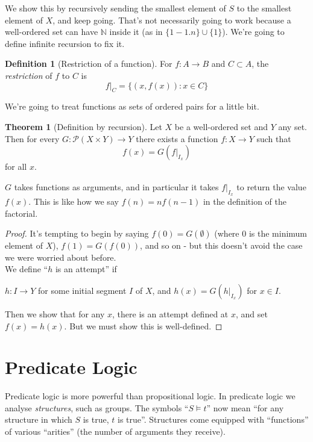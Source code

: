\documentclass{article}
\theoremstyle{definition}
\newtheorem{definition}{Definition}
\newtheorem{theorem}{Theorem}
\numberwithin{definition}{section}
\newcommand{\entails}{\models}
\begin{document}
We show this by recursively sending the smallest element of $S$ to the smallest element of $X$, and keep going. That's not necessarily going to work because a well-ordered set can have $\mathbb{N}$ inside it (as in $\{1-1.n\} \cup \{1\}$). We're going to define infinite recursion to fix it. \\
\begin{definition}[Restriction of a function]
For $f: A \to B$ and $C \subset A$, the \textit{restriction} of $f$ to $C$ is 
$$f|_{C} = \{(x,f(x)) : x \in C\}$$
\end{definition}
We're going to treat functions as sets of ordered pairs for a little bit. 
\begin{theorem}[Definition by recursion]
Let $X$ be a well-ordered set and $Y$ any set. Then for every $G: \mathcal{P}(X \times Y) \to Y$ there exists a function $f:X \to Y$ such that 
$$f(x) = G(f|_{I_{x}})$$
for all $x$. 
\end{theorem} 
$G$ takes functions as arguments, and in particular it takes $f|_{I_{x}}$ to return the value $f(x)$. This is like how we say $f(n) = nf(n-1)$ in the definition of the factorial. 
\begin{proof}
It's tempting to begin by saying $f(0) = G(\emptyset)$ (where $0$ is the minimum element of $X$), $f(1) = G(f(0))$, and so on - but this doesn't avoid the case we were worried about before. \\
We define ``$h$ is an attempt'' if
\begin{center}
$h:I \to Y$ for some initial segment $I$ of $X$, and $h(x) = G(h|_{I_{x}})$ for $x \in I$. 
\end{center}
Then we show that for any $x$, there is an attempt defined at $x$, and set $f(x)= h(x)$. But we must show this is well-defined. 


\end{proof}





\section{Predicate Logic}
Predicate logic is more powerful than propositional logic. In predicate logic 
  we analyse \textit{structures}, such as groups. The symbols ``$S \entails t$'' 
  now mean ``for any structure in which $S$ is true, $t$ is true''. 
  Structures come equipped with ``functions'' of various ``arities'' 
  (the number of arguments they receive). 
\end{document}
